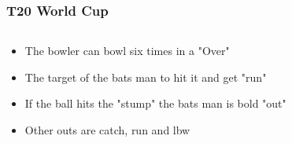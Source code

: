 \documentclass{beamer}
\begin{document}
\begin{frame}
  \frametitle{T20 World Cup}
  
	\begin{columns}
	
		\begin{column}{0.5\textwidth}
		  \begin{itemize}
			  \item The bowler can bowl six times in a "Over"
			  \item The target of the bats man to hit it and get "run"
			  \item If the ball hits the "stump" the bats man is bold "out"
			  \item Other outs are catch, run and lbw
		  \end{itemize}	
		\end{column}
		
		\begin{column}{0.5\textwidth}
			 \begin{center}  \end{center}
		\end{column}
		
	\end{columns} 
	
	
\end{frame}
\end{document}
